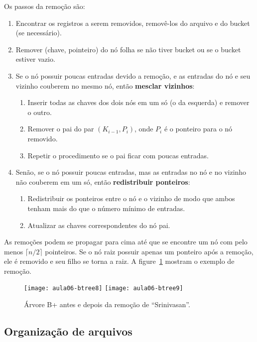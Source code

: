 Os passos da remoção são:
\begin{enumerate}
\item Encontrar os registros a serem removidos, removê-los do
arquivo e do bucket (se necessário).
\item Remover (chave, pointeiro) do nó folha se não tiver bucket ou se 
o bucket estiver vazio.
\item Se o nó possuir poucas entradas devido a remoção, e as entradas 
do nó e seu vizinho couberem no mesmo nó, então \textbf{mesclar vizinhos}:
	\begin{enumerate}
	\item Inserir todas as chaves dos dois nós em um só (o da esquerda) e 
	remover o outro.
	\item Remover o pai do par $(K_{i-1}, P_i)$, onde $P_i$ é o ponteiro
	para o nó removido.
	\item Repetir o procedimento se o pai ficar com poucas entradas.
	\end{enumerate}
\item Senão, se o nó possuir poucas entradas, mas as entradas no nó
e no vizinho não couberem em um só, então \textbf{redistribuir ponteiros}:
	\begin{enumerate}
	\item Redistribuir os ponteiros entre o nó e o vizinho de modo
	que ambos tenham mais do que o número mínimo de entradas.
	\item Atualizar as chaves correspondentes do nó pai.
	\end{enumerate}
\end{enumerate}

As remoções podem se propagar para cima até que se encontre um nó com pelo 
menos $\lceil n/2 \rceil$ pointeiros.
Se o nó raiz possuir apenas um ponteiro após a remoção, ele é removido e seu filho
se torna a raiz.
A figure~\ref{aula06:fig:btree8} mostram o exemplo de remoção.
%
\begin{figure}[!htb]
\centering
\texttt{[image: aula06-btree8]}
\texttt{[image: aula06-btree9]}
\caption{Árvore B+ antes e depois da remoção de ``Srinivasan''.}
\label{aula06:fig:btree8}
\end{figure}

\subsection{Organização de arquivos}

